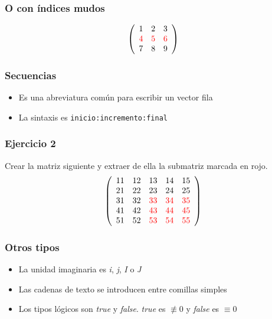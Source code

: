 \documentclass[12pt]{beamer}
\begin{document}
\begin{frame}
\frametitle{O con índices mudos}
\[ \left(
\begin{array}{ccc}
1&2&3\\
\textcolor{red}{4}&\textcolor{red}{5}&\textcolor{red}{6}\\
7&8&9
\end{array} \right)
\]
\testcode
\end{frame}

\testcode{
\begin{lstlisting}
\end{lstlisting}
}



\begin{frame}
\frametitle{Secuencias}
\begin{itemize}
\item Es una abreviatura común para escribir un vector fila
\item La sintaxis es \texttt{inicio:incremento:final}
\end{itemize}
\testcode
\end{frame}

\begin{frame}
\frametitle{Ejercicio 2} 
Crear la matriz siguiente y extraer de ella la submatriz marcada en rojo.
\[ \left( \begin{array}{ccccc}
11&12&13&14&15\\
21&22&23&24&25\\
31&32&\textcolor{red}{33}&\textcolor{red}{34}&\textcolor{red}{35}\\
41&42&\textcolor{red}{43}&\textcolor{red}{44}&\textcolor{red}{45}\\
51&52&\textcolor{red}{53}&\textcolor{red}{54}&\textcolor{red}{55}
\end{array} \right) \]
\end{frame}

\begin{frame}
\frametitle{Otros tipos}
\begin{itemize}
\item La unidad imaginaria es \emph{i}, \emph{j}, \emph{I} o \emph{J}
\item Las cadenas de texto se introducen entre comillas simples
\item Los tipos lógicos son \emph{true} y \emph{false}.  \emph{true}
  es $\not \equiv 0$ y \emph{false} es $\equiv 0$
\end{itemize}
\end{frame}
\end{document}
